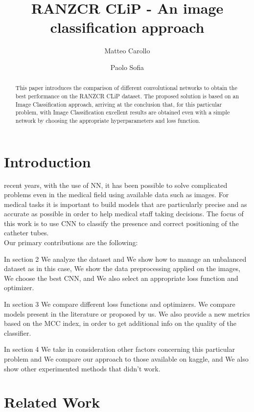 \documentclass[journal, a4paper]{IEEEtran}
\begin{document}
\title{RANZCR CLiP - An image classification approach }
\author{Matteo Carollo \and Paolo Sofia}
\maketitle
\graphicspath{ {./images/} }

\begin{abstract}
	This paper introduces the comparison of different convolutional networks to obtain the best performance on the RANZCR CLiP dataset. The proposed solution is based on an Image Classification approach, arriving at the conclusion that, for this particular problem, with Image Classification excellent results are obtained even with a simple network by choosing the appropriate hyperparameters and loss function.
\end{abstract}
\section{Introduction}
 recent years, with the use of NN, it has been possible to solve complicated problems even in the medical field using available data such as images. For medical tasks it is important to build models that are particularly precise and as accurate as possible in order to help medical staff taking decisions. The focus of this work is to use CNN to classify the presence and correct positioning of the catheter tubes.\\
Our primary contributions are the following:
	
In section 2 We analyze the dataset and We show how to manage an unbalanced dataset as in this case, We show the data preprocessing applied on the images, We choose the best CNN, and We also select an appropriate loss function and optimizer.
	
In section 3 We compare different loss functions and optimizers. We compare models present in the literature or proposed by us. We also provide a new metrics based on the MCC index, in order to get additional info on the quality of the classifier.
	
In section 4 We take in consideration other factors concerning this particular problem and We compare our approach to those available on kaggle, and We also show other experimented methods that didn't work.
	
\section{Related Work}
\end{document}
